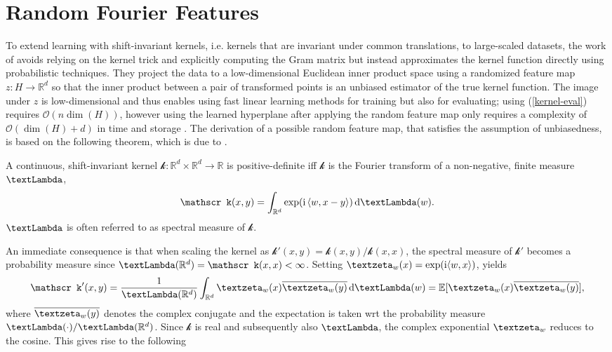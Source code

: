 \documentclass[openany]{book}
\begin{document}
\section{Random Fourier Features}
To extend learning with shift-invariant kernels, i.e. kernels that are invariant under common translations, to large-scaled datasets, the work of \cite{rahimi2007} avoids relying on the kernel trick and explicitly computing the Gram matrix but instead approximates the kernel function directly using probabilistic techniques. They project the data to a low-dimensional Euclidean inner product space using a randomized feature map $z:H\to \mathbb R^d$ so that the inner product between a pair of transformed points is an unbiased estimator of the true kernel function. The image under $z$ is low-dimensional and thus enables using fast linear learning methods for training but also for evaluating; using (\ref{kernel-eval}) requires $\mathscr O(n\dim(H))$, however using the learned hyperplane after applying the random feature map only requires a complexity of $\mathscr O(\dim(H)+d)$ in time and storage \cite{rahimi2007}.
The derivation of a possible random feature map, that satisfies the assumption of unbiasedness, is based on the following theorem, which is due to \cite{rudin1990}.
\begin{theorem}
    A continuous, shift-invariant kernel $\mathscr k:\mathbb R^d\times \mathbb R^d\to \mathbb R$ is positive-definite iff $\mathscr k$ is the Fourier transform of a non-negative, finite measure $\gLambda$, 
    \begin{equation*}
        \mathscr k(x,y)=\int_{\mathbb R^d}\exp(\mathrm i\,\langle w,x-y\rangle )\,\mathrm d\gLambda(w).
    \end{equation*}
    $\gLambda$ is often referred to as spectral measure of $\mathscr k$.
\end{theorem}
An immediate consequence is that when scaling the kernel as $\mathscr k'(x,y)=\mathscr k(x,y)/\mathscr k(x,x)$, the spectral measure of $\mathscr k'$ becomes a probability measure since $\gLambda(\mathbb R^d)=\mathscr k(x,x)<\infty$. Setting $\gzeta_w(x)=\exp(\mathrm i\langle w,x\rangle)$, yields
\begin{equation*}
    \mathscr k'(x,y)=\frac{1}{\gLambda(\mathbb R^d)}\int_{\mathbb R^d}\gzeta_w(x)\overline{\gzeta_w(y)}\,\mathrm d\gLambda(w)=\mathbb E[\gzeta_w(x)\overline{\gzeta_w(y)}],
\end{equation*}
where $\overline{\gzeta_w(y)}$ denotes the complex conjugate and the expectation is taken wrt the probability measure $\gLambda(\cdot)/\gLambda(\mathbb R^d)$. Since $\mathscr k$ is real and subsequently also $\gLambda$, the complex exponential $\gzeta_w$ reduces to the cosine. This gives rise to the following
\end{document}
